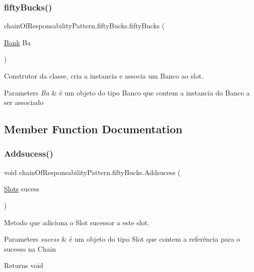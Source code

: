 \subsubsection{\texorpdfstring{fiftyBucks()}{fiftyBucks()}}
{\footnotesize\ttfamily chain\+Of\+Responsability\+Pattern.\+fifty\+Bucks.\+fifty\+Bucks (\begin{DoxyParamCaption}\item[{\mbox{\hyperlink{classmediator_pattern_1_1_bank}{Bank}}}]{Ba }\end{DoxyParamCaption})}



Construtor da classe, cria a instancia e associa um Banco ao slot. 


\begin{DoxyParams}{Parameters}
{\em Ba} & é um objeto do tipo Banco que contem a instancia do Banco a ser associado \\
\hline
\end{DoxyParams}


\subsection{Member Function Documentation}
\mbox{\label{classchain_of_responsability_pattern_1_1fifty_bucks_a5ea94a00d828803aa2c256ba4d2c9ffb}} 
\subsubsection{\texorpdfstring{Addsucess()}{Addsucess()}}
{\footnotesize\ttfamily void chain\+Of\+Responsability\+Pattern.\+fifty\+Bucks.\+Addsucess (\begin{DoxyParamCaption}\item[{\mbox{\hyperlink{interfacechain_of_responsability_pattern_1_1_slots}{Slots}}}]{sucess }\end{DoxyParamCaption})}



Metodo que adiciona o Slot sucessor a este slot. 


\begin{DoxyParams}{Parameters}
{\em sucess} & é um objeto do tipo Slot que contem a referência para o sucesso na Chain \\
\hline
\end{DoxyParams}
\begin{DoxyReturn}{Returns}
void 
\end{DoxyReturn}
\mbox{\label{classchain_of_responsability_pattern_1_1fifty_bucks_a4c121b5ed57a0de7ea0e1669d4b60b5c}} 
